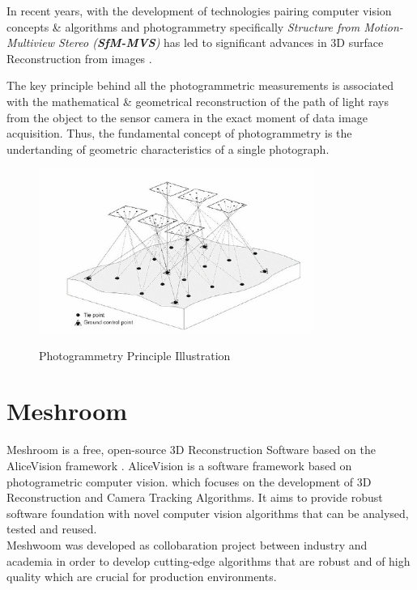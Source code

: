 \documentclass[12pt]{report}
\begin{document}
In recent years, with the development of technologies pairing computer vision concepts \& algorithms and photogrammetry specifically \textit{Structure from Motion-Multiview Stereo (\textbf{SfM-MVS})}
has led to significant advances in 3D surface Reconstruction from images .

The key principle behind all the photogrammetric measurements is associated with the mathematical \& geometrical reconstruction of the path of light rays from the object to the sensor camera in the exact moment of data image acquisition.
Thus, the fundamental concept of photogrammetry is the undertanding of geometric characteristics of a single photograph.

\begin{figure}[h]
  \centering
  \includegraphics[width=0.8\textwidth]{photogrammetry.png}
  \caption{Photogrammetry Principle Illustration}\cite[]{photogrammetry_def}
  \label{fig:photogrammetry_principle} 
\end{figure}

\section{Meshroom}
\label{section:meshroom}
Meshroom is a free, open-source 3D Reconstruction Software based on the AliceVision framework .
AliceVision is a software framework based on photogrametric computer vision.  which focuses on the development of 3D Reconstruction and Camera Tracking Algorithms.
It aims to provide robust software foundation with novel computer vision algorithms that can be analysed, tested and reused.\\
Meshwoom was developed as collobaration project between industry and academia in order to develop cutting-edge algorithms that are robust and of high quality which are crucial for production environments.
\end{document}
